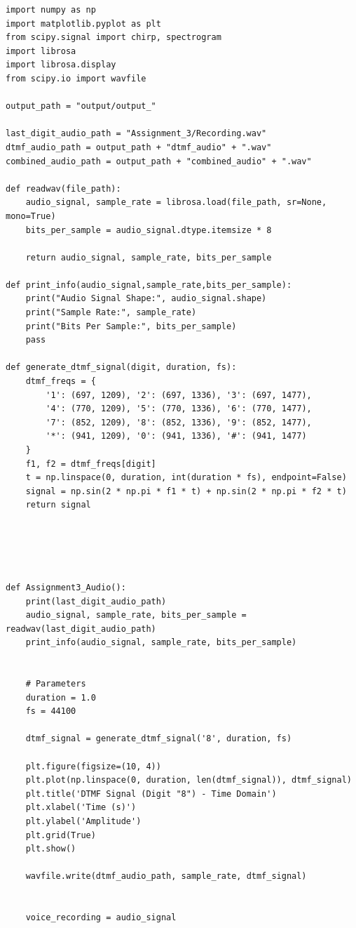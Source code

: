 \documentclass[letterpaper, 12pt]{article}
\begin{document}
\newpage
\begin{lstlisting}
import numpy as np
import matplotlib.pyplot as plt
from scipy.signal import chirp, spectrogram
import librosa
import librosa.display
from scipy.io import wavfile

output_path = "output/output_"

last_digit_audio_path = "Assignment_3/Recording.wav"
dtmf_audio_path = output_path + "dtmf_audio" + ".wav"
combined_audio_path = output_path + "combined_audio" + ".wav"

def readwav(file_path):
    audio_signal, sample_rate = librosa.load(file_path, sr=None, mono=True)
    bits_per_sample = audio_signal.dtype.itemsize * 8

    return audio_signal, sample_rate, bits_per_sample

def print_info(audio_signal,sample_rate,bits_per_sample):
    print("Audio Signal Shape:", audio_signal.shape)
    print("Sample Rate:", sample_rate)
    print("Bits Per Sample:", bits_per_sample)
    pass

def generate_dtmf_signal(digit, duration, fs):
    dtmf_freqs = {
        '1': (697, 1209), '2': (697, 1336), '3': (697, 1477),
        '4': (770, 1209), '5': (770, 1336), '6': (770, 1477),
        '7': (852, 1209), '8': (852, 1336), '9': (852, 1477),
        '*': (941, 1209), '0': (941, 1336), '#': (941, 1477)
    }
    f1, f2 = dtmf_freqs[digit]
    t = np.linspace(0, duration, int(duration * fs), endpoint=False)
    signal = np.sin(2 * np.pi * f1 * t) + np.sin(2 * np.pi * f2 * t)
    return signal





def Assignment3_Audio():
    print(last_digit_audio_path)
    audio_signal, sample_rate, bits_per_sample = readwav(last_digit_audio_path)
    print_info(audio_signal, sample_rate, bits_per_sample)


    # Parameters
    duration = 1.0  
    fs = 44100  

    dtmf_signal = generate_dtmf_signal('8', duration, fs)

    plt.figure(figsize=(10, 4))
    plt.plot(np.linspace(0, duration, len(dtmf_signal)), dtmf_signal)
    plt.title('DTMF Signal (Digit "8") - Time Domain')
    plt.xlabel('Time (s)')
    plt.ylabel('Amplitude')
    plt.grid(True)
    plt.show()

    wavfile.write(dtmf_audio_path, sample_rate, dtmf_signal)


    voice_recording = audio_signal  


\end{lstlisting}
\end{document}
